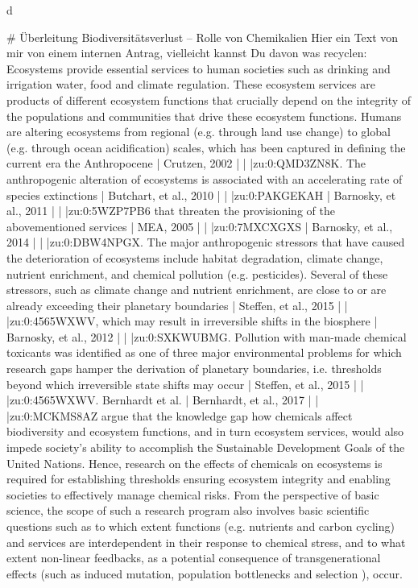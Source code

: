 d\documentclass[english]{article}
\begin{document}
# Überleitung Biodiversitätsverlust – Rolle von Chemikalien
Hier ein Text von mir von einem internen Antrag, vielleicht kannst Du davon was recyclen:
Ecosystems provide essential services to human societies such as drinking and irrigation water, food and climate regulation. These ecosystem services are products of different ecosystem functions that crucially depend on the integrity of the populations and communities that drive these ecosystem functions. Humans are altering ecosystems from regional (e.g. through land use change) to global (e.g. through ocean acidification) scales, which has been captured in defining the current era the Anthropocene { | Crutzen, 2002 | | |zu:0:QMD3ZN8K}. The anthropogenic alteration of ecosystems is associated with an accelerating rate of species extinctions { | Butchart, et al., 2010 | | |zu:0:PAKGEKAH}{ | Barnosky, et al., 2011 | | |zu:0:5WZP7PB6} that threaten the provisioning of the abovementioned services { | MEA, 2005 | | |zu:0:7MXCXGXS}{ | Barnosky, et al., 2014 | | |zu:0:DBW4NPGX}. The major anthropogenic stressors that have caused the deterioration of ecosystems include habitat degradation, climate change, nutrient enrichment, and chemical pollution (e.g. pesticides). Several of these stressors, such as climate change and nutrient enrichment, are close to or are already exceeding their planetary boundaries { | Steffen, et al., 2015 | | |zu:0:4565WXWV}, which may result in irreversible shifts in the biosphere { | Barnosky, et al., 2012 | | |zu:0:SXKWUBMG}. Pollution with man-made chemical toxicants was identified as one of three major environmental problems for which research gaps hamper the derivation of planetary boundaries, i.e. thresholds beyond which irreversible state shifts may occur { | Steffen, et al., 2015 | | |zu:0:4565WXWV}. Bernhardt et al. { | Bernhardt, et al., 2017 | | |zu:0:MCKMS8AZ} argue that the knowledge gap how chemicals affect biodiversity and ecosystem functions, and in turn ecosystem services, would also impede society’s ability to accomplish the Sustainable Development Goals of the United Nations. Hence, research on the effects of chemicals on ecosystems is required for establishing thresholds ensuring ecosystem integrity and enabling societies to effectively manage chemical risks. From the perspective of basic science, the scope of such a research program also involves basic scientific questions such as to which extent functions (e.g. nutrients and carbon cycling) and services are interdependent in their response to chemical stress, and to what extent non-linear feedbacks, as a potential consequence of transgenerational effects (such as induced mutation, population bottlenecks and selection ), occur.
\end{document}
